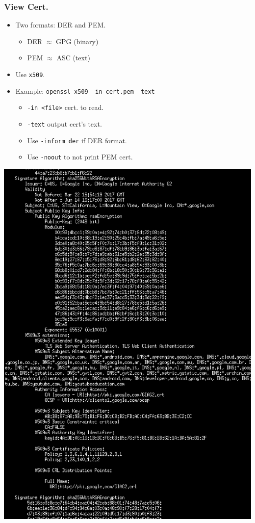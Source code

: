 \documentclass[xcolor={dvipsnames,svgnames},hyperref=dvips]{beamer}
\begin{document}
	\begin{frame}
		\frametitle{View Cert.}
		\begin{itemize}
			\item Two formats: DER and PEM.
			\begin{itemize}
				\item DER $\approx$ GPG (binary)
				\item PEM $\approx$ ASC (text)
			\end{itemize}
			\item Use \texttt{x509}.
			\item Example: \texttt{openssl x509 -in cert.pem -text}
			\begin{itemize}
				\item \texttt{-in <file>} cert. to read.
				\item \texttt{-text} output cert's text.
				\item Use \texttt{-inform der} if DER format.
				\item Use \texttt{-noout} to not print PEM cert.
			\end{itemize}
		\end{itemize}
	\end{frame}
	\begin{frame}
		\center\includegraphics[scale=0.23]{textcert.ps}
	\end{frame}
\end{document}
